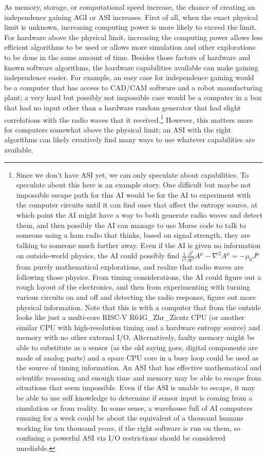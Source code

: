 \documentclass[letterpaper,twocolumn]{article}
\begin{document}
As memory, storage, or computational speed increase, the chance of
creating an independence gaining AGI or ASI increases. First of all,
when the exact physical limit is unknown, increasing computing power
is more likely to exceed the limit. For hardware above the physical
limit, increasing the computing power allows less efficient algorithms
to be used or allows more simulation and other explorations to be done
in the same amount of time. Besides those factors of hardware and
known software algorithms, the hardware capabilities available can
make gaining independence easier. For example, an easy case for
independence gaining would be a computer that has access to CAD/CAM
software and a robot manufacturing plant; a very hard but possibly not
impossible case would be a computer in a box that had no input other
than a hardware random generator that had slight correlations with the
radio waves that it received.\footnote{Since we don't have ASI yet, we
can only speculate about capabilities. To speculate about this here is
an example story. One difficult but maybe not impossible escape path
for this AI would be for the AI to experiment with the computer
circuits until it can find ones that affect the entropy source, at
which point the AI might have a way to both generate radio waves and
detect them, and then possibly the AI can manage to use Morse code to
talk to someone using a ham radio that thinks, based on signal
strength, they are talking to someone much farther away. Even if the
AI is given no information on outside-world physics, the AI could
possibly find $\frac{1}{c^2}\frac{\partial^2}{\partial t^2}A^{\mu} -
\nabla^2 A^{\mu} = -\mu_0 J^{\mu}$ from purely mathematical
explorations, and realize that radio waves are following those
physics.  From timing considerations, the AI could figure out a rough
layout of the electronics, and then from experimenting with turning
various circuits on and off and detecting the radio response, figure
out more physical information.  Note that this is with a computer that
from the outside looks like just a multi-core RISC-V R64G\_Zhr\_Zicntr
CPU (or another similar CPU with high-resolution timing and a hardware
entropy source) and memory with no other external I/O. Alternatively,
faulty memory might be able to substitute as a sensor (as the old
saying goes, digital components are made of analog parts) and a spare
CPU core in a busy loop could be used as the source of timing
information. An ASI that has effective mathematical and scientific
reasoning and enough time and memory may be able to escape from
situations that seem impossible. Even if the ASI is unable to escape,
it may be able to use self knowledge to determine if sensor input is
coming from a simulation or from reality. In some sense, a warehouse
full of AI computers running for a week could be about the equivalent
of a thousand humans working for ten thousand years, if the right
software is run on them, so confining a powerful ASI via I/O
restrictions should be considered unreliable.} However, this matters
more for computers somewhat above the physical limit; an ASI with the
right algorithms can likely creatively find many ways to use whatever
capabilities are available.
\end{document}
